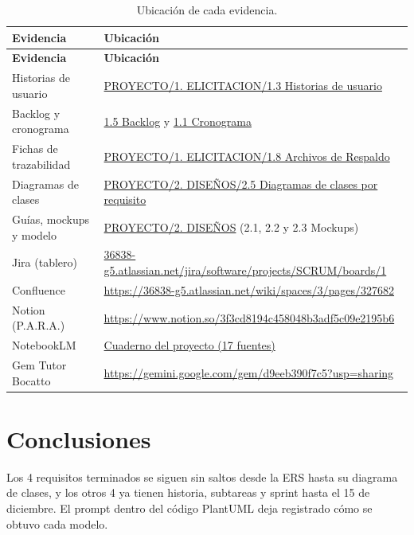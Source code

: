 \documentclass[a4paper, 11pt]{article}
\begin{document}
{\footnotesize
\begin{longtable}{|p{3.4cm}|p{10.8cm}|}
\caption{Ubicación de cada evidencia.}\label{tab:links}\\
\hline
\textbf{Evidencia} & \textbf{Ubicación} \\ \hline
\endfirsthead
\hline
\textbf{Evidencia} & \textbf{Ubicación} \\ \hline
\endhead
Historias de usuario & \href{https://github.com/Ricardo-lainez/RicardoLainez36838_G5_ADSW/tree/main/PROYECTO/1.\%20ELICITACION/1.3\%20Historias\%20de\%20usuario}{PROYECTO/1. ELICITACION/1.3 Historias de usuario} \\ \hline
Backlog y cronograma & \href{https://github.com/Ricardo-lainez/RicardoLainez36838_G5_ADSW/tree/main/PROYECTO/1.\%20ELICITACION/1.5\%20Backlog}{1.5 Backlog} y \href{https://github.com/Ricardo-lainez/RicardoLainez36838_G5_ADSW/tree/main/PROYECTO/1.\%20ELICITACION/1.1\%20Cronograma}{1.1 Cronograma} \\ \hline
Fichas de trazabilidad & \href{https://github.com/Ricardo-lainez/RicardoLainez36838_G5_ADSW/tree/main/PROYECTO/1.\%20ELICITACION/1.8\%20Archivos\%20de\%20Respaldo}{PROYECTO/1. ELICITACION/1.8 Archivos de Respaldo} \\ \hline
Diagramas de clases & \href{https://github.com/Ricardo-lainez/RicardoLainez36838_G5_ADSW/tree/main/PROYECTO/2.\%20DISE\%C3\%91OS/2.5\%20Diagramas\%20de\%20clases\%20por\%20requisito}{PROYECTO/2. DISEÑOS/2.5 Diagramas de clases por requisito} \\ \hline
Guías, mockups y modelo & \href{https://github.com/Ricardo-lainez/RicardoLainez36838_G5_ADSW/tree/main/PROYECTO/2.\%20DISE\%C3\%91OS}{PROYECTO/2. DISEÑOS} (2.1, 2.2 y 2.3 Mockups) \\ \hline
Jira (tablero) & \href{https://36838-g5.atlassian.net/jira/software/projects/SCRUM/boards/1}{36838-g5.atlassian.net/jira/software/projects/SCRUM/boards/1} \\ \hline
Confluence & \url{https://36838-g5.atlassian.net/wiki/spaces/3/pages/327682} \\ \hline
Notion (P.A.R.A.) & \url{https://www.notion.so/3f3cd8194c458048b3adf5c09e2195b6} \\ \hline
NotebookLM & \href{https://notebook.google.com/notebook/eca2758b-8588-4cd0-880c-3fe946384210}{Cuaderno del proyecto (17 fuentes)} \\ \hline
Gem Tutor Bocatto & \url{https://gemini.google.com/gem/d9eeb390f7c5?usp=sharing} \\ \hline
\end{longtable}
}

\section{Conclusiones}

Los 4 requisitos terminados se siguen sin saltos desde la ERS hasta su diagrama de clases, y los otros 4 ya tienen historia, subtareas y sprint hasta el 15 de diciembre. El prompt dentro del código PlantUML deja registrado cómo se obtuvo cada modelo.
\end{document}
